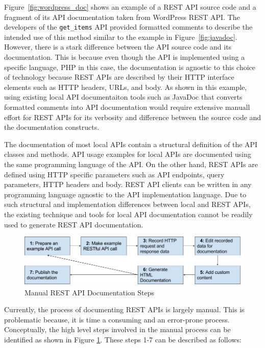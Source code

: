 Figure~\ref{fig:wordpress_doc} shows an example of a REST API source code and a fragment of its API documentation
taken from WordPress REST API. The developers of the \texttt{get\_items} API provided formatted comments to describe the intended use of this method similar to the example
in Figure~\ref{fig:javadoc}. However, there is a stark difference between the API source code and its documentation. This is because even though the API is implemented
using a specific language, PHP in this case, the documentation is agnostic to this choice of technology because REST APIs are described by their HTTP interface elements such as
HTTP headers, URLs, and body. As shown in this example, using existing local API documentaiton tools such as JavaDoc that converts formatted comments into API documentation would require extensive
manuall effort for REST APIs for its verbosity and difference between the source code and the documentation constructs.

The documentation of most local APIs
contain a structural definition of the API classes and methods. API usage examples for local APIs are documented using the same programming language of the API. On the other hand, REST APIs
are defined using HTTP specific parameters such as API endpoints, query parameters, HTTP headers and body. REST API clients can be written in any programming language agnostic to the API
implementation language. Due to such structural and implementation differences between local and REST APIs, the existing technique and tools for local API documentation cannot be readily
used to generate REST API documentation.


\begin{figure}[htb]
  \includegraphics[width=\linewidth]{manual_workflow.png}
  \caption{Manual REST API Documentation Steps}
  \label{fig:manual}
\end{figure}

Currently, the process of documenting REST APIs is largely manual. This is problematic because, it is time a consuming and an error-prone process. Conceptually, the high level steps involved in the manual process can be identified as shown in Figure \ref{fig:manual}. These steps 1-7 can be described as follows:

